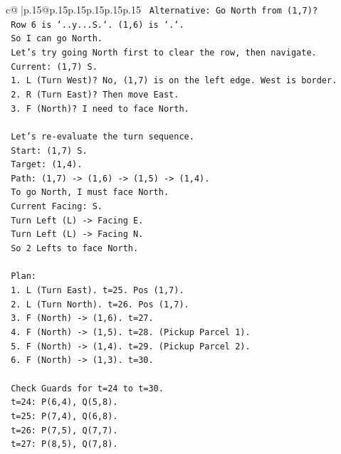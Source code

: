 \documentclass{article}
\begin{document}
{\begin{supertabular}{c@{$\;$}|p{.15\linewidth}@{}p{.15\linewidth}p{.15\linewidth}p{.15\linewidth}p{.15\linewidth}p{.15\linewidth}}
{{{\texttt{   Alternative: Go North from (1,7)?} \\
\texttt{   Row 6 is `..y...S.`. (1,6) is `.`.} \\
\texttt{   So I can go North.} \\
\texttt{   Let's try going North first to clear the row, then navigate.} \\
\texttt{   Current: (1,7) S.} \\
\texttt{   1. L (Turn West)? No, (1,7) is on the left edge. West is border.} \\
\texttt{   2. R (Turn East)? Then move East.} \\
\texttt{   3. F (North)? I need to face North.} \\
\\ 
\texttt{   Let's re{-}evaluate the turn sequence.} \\
\texttt{   Start: (1,7) S.} \\
\texttt{   Target: (1,4).} \\
\texttt{   Path: (1,7) {-}> (1,6) {-}> (1,5) {-}> (1,4).} \\
\texttt{   To go North, I must face North.} \\
\texttt{   Current Facing: S.} \\
\texttt{   Turn Left (L) {-}> Facing E.} \\
\texttt{   Turn Left (L) {-}> Facing N.} \\
\texttt{   So 2 Lefts to face North.} \\
\\ 
\texttt{   Plan:} \\
\texttt{   1. L (Turn East). t=25. Pos (1,7).} \\
\texttt{   2. L (Turn North). t=26. Pos (1,7).} \\
\texttt{   3. F (North) {-}> (1,6). t=27.} \\
\texttt{   4. F (North) {-}> (1,5). t=28. (Pickup Parcel 1).} \\
\texttt{   5. F (North) {-}> (1,4). t=29. (Pickup Parcel 2).} \\
\texttt{   6. F (North) {-}> (1,3). t=30.} \\
\\ 
\texttt{   Check Guards for t=24 to t=30.} \\
\texttt{   t=24: P(6,4), Q(5,8).} \\
\texttt{   t=25: P(7,4), Q(6,8).} \\
\texttt{   t=26: P(7,5), Q(7,7).} \\
\texttt{   t=27: P(8,5), Q(7,8).} \\
}}}
\end{supertabular}}
\end{document}
